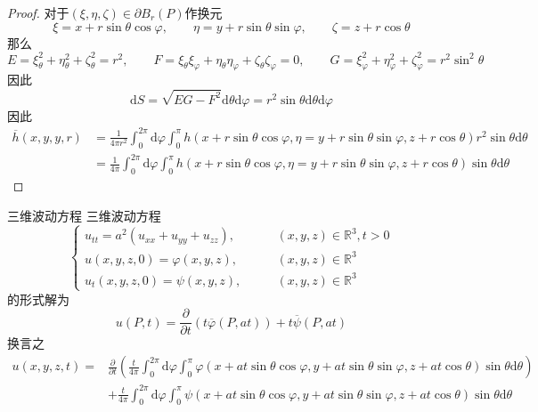 \documentclass[lang = cn, scheme = chinese, thmcnt = section]{elegantbook}
\newcommand{\R}{\mathbb{R}}            %
\newcommand{\dd}{\mathrm{d}}           %
\begin{document}
\begin{proof}
	对于$(\xi,\eta,\zeta)\in \partial B_r(P)$作换元%
	$$
	\xi=x+r\sin\theta\cos\varphi,\qquad
	\eta=y+r\sin\theta\sin\varphi,\qquad
	\zeta=z+r\cos\theta
	$$
	那么%
	$$
	E=\xi_\theta^2+\eta_\theta^2+\zeta_\theta^2=r^2,\qquad
	F=\xi_\theta\xi_\varphi+\eta_\theta\eta_\varphi+\zeta_\theta\zeta_\varphi=0,\qquad
	G=\xi_\varphi^2+\eta_\varphi^2+\zeta_\varphi^2=r^2\sin^2\theta
	$$
	因此%
	$$
	\dd S=\sqrt{EG-F^2}\dd\theta\dd\varphi
	=r^2\sin\theta\dd\theta\dd\varphi
	$$
	因此%
	\begin{align*}
		\overline{h}(x,y,y,r)
		& = \frac{1}{4\pi r^2}\int_{0}^{2\pi}\dd\varphi\int_{0}^{\pi}
		h(x+r\sin\theta\cos\varphi,\eta=y+r\sin\theta\sin\varphi,z+r\cos\theta)r^2\sin\theta\dd\theta\\
		& = \frac{1}{4\pi}\int_{0}^{2\pi}\dd\varphi\int_{0}^{\pi}
		h(x+r\sin\theta\cos\varphi,\eta=y+r\sin\theta\sin\varphi,z+r\cos\theta)\sin\theta\dd\theta
	\end{align*}
\end{proof}

\begin{theorem}{三维波动方程}
	三维波动方程
	$$
	\begin{cases}
		u_{tt}=a^2(u_{xx}+u_{yy}+u_{zz}),\qquad & (x,y,z)\in \R^3,t>0\\
		u(x,y,z,0)=\varphi(x,y,z),\qquad & (x,y,z)\in \R^3\\
		u_t(x,y,z,0)=\psi(x,y,z),\qquad & (x,y,z)\in \R^3
	\end{cases}
	$$
	的形式解为
	$$
	u(P,t)
	=\frac{\partial}{\partial t}(t\overline{\varphi}(P,at))
	+t\overline{\psi}(P,at)
	$$
	换言之
	\begin{align*}
		u(x,y,z,t)
		= & \frac{\partial}{\partial t}\left(\frac{t}{4\pi}\int_{0}^{2\pi}\dd\varphi\int_{0}^{\pi}\varphi(x+at\sin\theta\cos\varphi,y+at\sin\theta\sin\varphi,z+at\cos\theta)\sin\theta\dd\theta\right)\\
		& + \frac{t}{4\pi}\int_{0}^{2\pi}\dd\varphi\int_{0}^{\pi}\psi(x+at\sin\theta\cos\varphi,y+at\sin\theta\sin\varphi,z+at\cos\theta)\sin\theta\dd\theta
	\end{align*}
\end{theorem}
\end{document}
